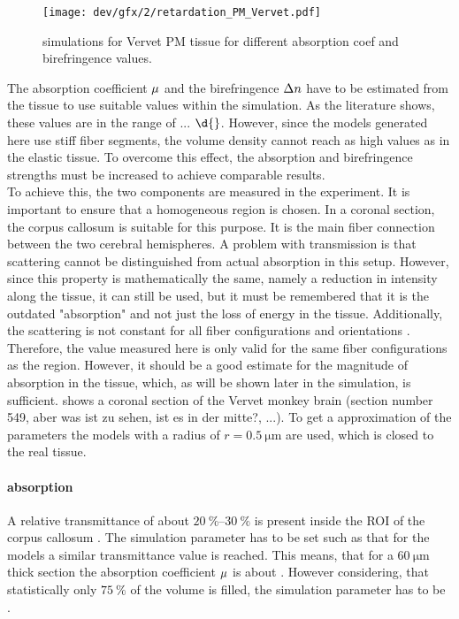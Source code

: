 % 
\begin{figure}[!tp]
\centering
\texttt{[image: dev/gfx/2/retardation\_PM\_Vervet.pdf]}
\caption{simulations for Vervet PM tissue for different absorption coef and birefringence values.}
\label{fig:parameterModelSim}
\end{figure}
% 
The absorption coefficient $\textnormal{$\mu$}{}$ and the birefringence $\textnormal{$\Delta n$}{}$ have to be estimated from the tissue to use suitable values within the simulation.
As the literature shows, these values are in the range of ... $\d{}$.
However, since the models generated here use stiff fiber segments, the volume density cannot reach as high values as in the elastic tissue.
To overcome this effect, the absorption and birefringence strengths must be increased to achieve comparable results.
\\
To achieve this, the two components are measured in the experiment.
It is important to ensure that a homogeneous region is chosen.
In a coronal section, the corpus callosum is suitable for this purpose. It is the main fiber connection between the two cerebral hemispheres.
A problem with transmission is that scattering cannot be distinguished from actual absorption in this setup.
However, since this property is mathematically the same, namely a reduction in intensity along the tissue, it can still be used, but it must be remembered that it is the outdated "absorption" and not just the loss of energy in the tissue.
Additionally, the scattering is not constant for all fiber configurations and orientations \dummy{}.
Therefore, the value measured here is only valid for the same fiber configurations as the region.
However, it should be a good estimate for the magnitude of absorption in the tissue, which, as will be shown later in the simulation, is sufficient.
% 
 shows a coronal section of the Vervet monkey brain \dummy(section number 549, aber was ist zu sehen, ist es in der mitte?, ...).
% 
To get a approximation of the parameters the models with a radius of $r=\SI{0.5}{\micro\meter}$ are used, which is closed to the real tissue.
% 
% 
% 
\paragraph{absorption}
% 
A relative transmittance of about $\SIrange{20}{30}{\percent}$ is present inside the \ac{ROI} of the corpus callosum . 
The simulation parameter has to be set such as that for the models a similar transmittance value is reached.
This means, that for a $\SI{60}{\micro\meter}$ thick section the absorption coefficient $\textnormal{$\mu$}{}$ is about \dummy{}. However considering, that statistically only $\SI{75}{\percent}$ of the volume is filled, the simulation parameter has to be \dummy{}.
% 

